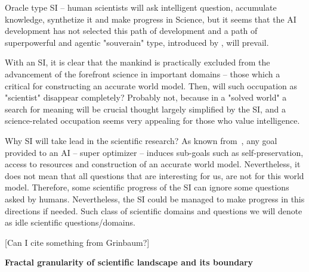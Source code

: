 \documentclass[a4paper,11pt]{article}
\begin{document}
    Oracle type SI -- human scientists will ask intelligent question, accumulate knowledge, synthetize it and make progress in Science, but it seems that the AI development has not selected this path of development and a path of superpowerful and agentic "souverain" type, introduced by \textcite{Bostrom2014}, will prevail.

    With an SI, it is clear that the mankind is practically excluded from the advancement of the forefront science in important domains -- those which a critical for constructing an accurate world model. Then, will such occupation as "scientist" disappear completely? Probably not, because in a "solved world" a search for meaning will be crucial thought largely simplified by the SI, and a science-related occupation seems very appealing for those who value intelligence.

    Why SI will take lead in the scientific research? As known from~\parencite{Bostrom2014,Tegmark2017}, any goal provided to an AI -- super optimizer -- induces sub-goals such as self-preservation, access to resources and construction of an accurate world model.
    Nevertheless, it does not mean that all questions that are interesting for us, are not for this world model. Therefore, some scientific progress of the SI can ignore some questions asked by humans. Nevertheless, the SI could be managed to make progress in this directions if needed. Such class of scientific domains and questions we will denote as  idle scientific questions/domains.

    [Can I cite something from Grinbaum?]

\textbf{Fractal granularity of scientific landscape and its boundary}
\end{document}
